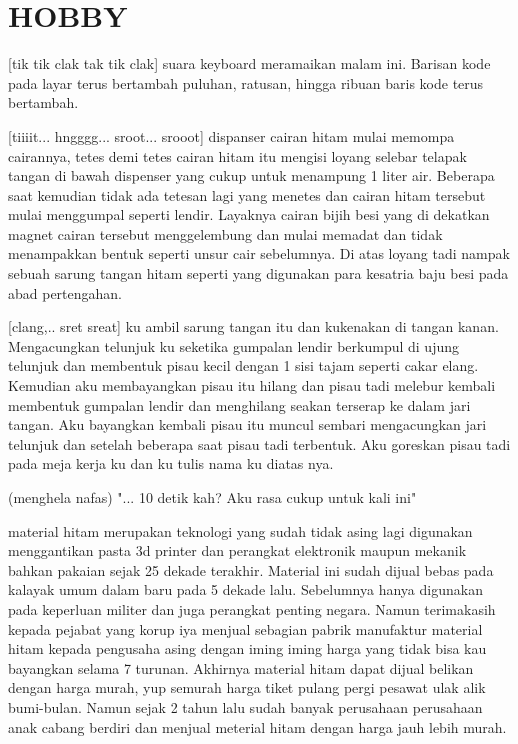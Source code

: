 \chapter{HOBBY}

[tik tik clak tak tik clak] suara keyboard meramaikan malam ini. Barisan kode pada layar terus bertambah puluhan, ratusan, hingga ribuan baris kode terus bertambah.

[tiiiit... hngggg... sroot... srooot] dispanser cairan hitam mulai memompa cairannya, tetes demi tetes cairan hitam itu mengisi loyang selebar telapak tangan di bawah dispenser yang cukup untuk menampung 1 liter air. Beberapa saat kemudian tidak ada tetesan lagi yang menetes dan cairan hitam tersebut mulai menggumpal seperti lendir. Layaknya cairan bijih besi yang di dekatkan magnet cairan tersebut menggelembung dan mulai memadat dan tidak menampakkan bentuk seperti unsur cair sebelumnya. Di atas loyang tadi nampak sebuah sarung tangan hitam seperti yang digunakan para kesatria baju besi pada abad pertengahan.

[clang,.. sret sreat] ku ambil sarung tangan itu dan kukenakan di tangan kanan. Mengacungkan telunjuk ku seketika gumpalan lendir berkumpul di ujung telunjuk dan membentuk pisau kecil dengan 1 sisi tajam seperti cakar elang. Kemudian aku membayangkan pisau itu hilang dan pisau tadi melebur kembali membentuk gumpalan lendir dan menghilang seakan terserap ke dalam jari tangan. Aku bayangkan kembali pisau itu muncul sembari mengacungkan jari telunjuk dan setelah beberapa saat pisau tadi terbentuk. Aku goreskan pisau tadi pada meja kerja ku dan ku tulis nama ku diatas nya.

(menghela nafas) "... 10 detik kah? Aku rasa cukup untuk kali ini"

material hitam merupakan teknologi yang sudah tidak asing lagi digunakan menggantikan pasta 3d printer dan perangkat elektronik maupun mekanik bahkan pakaian sejak 25 dekade terakhir. Material ini sudah dijual bebas pada kalayak umum dalam baru pada 5 dekade lalu. Sebelumnya hanya digunakan pada keperluan militer dan juga perangkat penting negara. Namun terimakasih kepada pejabat yang korup iya menjual sebagian pabrik manufaktur material hitam kepada pengusaha asing dengan iming iming harga yang tidak bisa kau bayangkan selama 7 turunan. Akhirnya material hitam dapat dijual belikan dengan harga murah, yup semurah harga tiket pulang pergi pesawat ulak alik bumi-bulan. Namun sejak 2 tahun lalu sudah banyak perusahaan perusahaan anak cabang berdiri dan menjual meterial hitam dengan harga jauh lebih murah.

